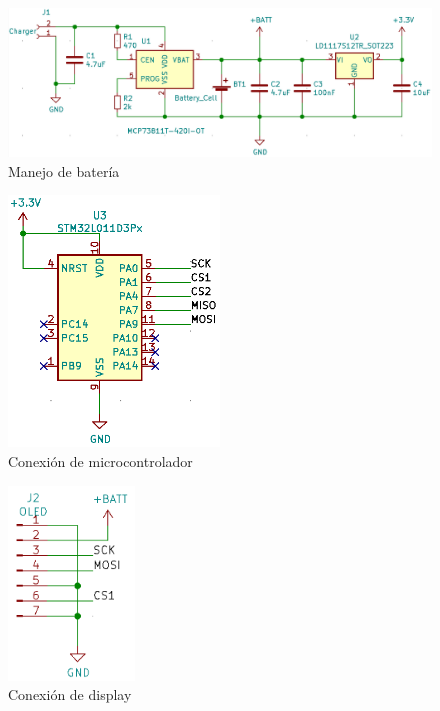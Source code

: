 \documentclass[
    11pt,
    spanish,
	a4paper
]{article}
\begin{document}
\begin{figure}[h!]
    \centering
    \includegraphics[width=\textwidth]{img/battmgr.png}
    \caption{Manejo de batería}
    \label{fig:battmgr}
\end{figure}

\begin{figure}[h!]
    \centering
    \includegraphics[width=0.5\textwidth]{img/stm32.png}
    \caption{Conexión de microcontrolador}
    \label{fig:stm32}
\end{figure}

\begin{figure}[h!]
    \centering
    \includegraphics[width=0.3\textwidth]{img/oled.png}
    \caption{Conexión de display}
    \label{fig:stm32}
\end{figure}
\end{document}
